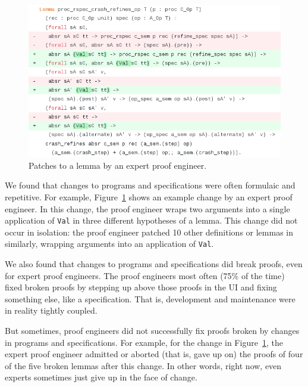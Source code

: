 \begin{figure}
  \includegraphics[width=1.0\textwidth]{maintenance/fig/patch.png}
  \caption{Patches to a lemma by an expert proof engineer.}
  \label{fig:patch}
\end{figure}

We found that changes to programs and specifications were often formulaic and repetitive.
For example, Figure~\ref{fig:patch} shows an example change by an expert proof engineer.
In this change, the proof engineer wraps two arguments into a single application of \lstinline{Val}
in three different hypotheses of a lemma.
This change did not occur in isolation: the proof engineer patched 10 other definitions or lemmas
in similarly, wrapping arguments into an application of
\lstinline{Val}.

We also found that changes to programs and specifications did break proofs, even for expert proof engineers.
The proof engineers most often (75\% of the time) fixed broken proofs by stepping 
up above those proofs in the UI and fixing something else, like a specification.
That is, development and maintenance were in reality tightly coupled.

But sometimes, proof engineers did not successfully fix proofs broken by changes in programs and specifications.
For example, for the change in Figure~\ref{fig:patch},
the expert proof engineer admitted or aborted (that is, gave up on) the proofs of four of the five
broken lemmas after this change.
In other words, right now, even experts sometimes just give up in the face of change.


